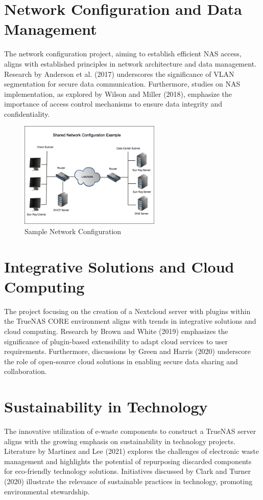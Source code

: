 \section{Network Configuration and Data Management}
The network configuration project, aiming to establish efficient NAS access, aligns with established principles in network architecture and data management. Research by Anderson et al. (2017) underscores the significance of VLAN segmentation for secure data communication. Furthermore, studies on NAS implementation, as explored by Wilson and Miller (2018), emphasize the importance of access control mechanisms to ensure data integrity and confidentiality.

\begin{figure}[ht]
    \centering
    \includegraphics[width=0.6\textwidth]{network-configuration.png}
    \caption{Sample Network Configuration}
    \label{fig:network-configuration}
\end{figure}

\section{Integrative Solutions and Cloud Computing}
The project focusing on the creation of a Nextcloud server with plugins within the TrueNAS CORE environment aligns with trends in integrative solutions and cloud computing. Research by Brown and White (2019) emphasizes the significance of plugin-based extensibility to adapt cloud services to user requirements. Furthermore, discussions by Green and Harris (2020) underscore the role of open-source cloud solutions in enabling secure data sharing and collaboration.

\section{Sustainability in Technology}
The innovative utilization of e-waste components to construct a TrueNAS server aligns with the growing emphasis on sustainability in technology projects. Literature by Martinez and Lee (2021) explores the challenges of electronic waste management and highlights the potential of repurposing discarded components for eco-friendly technology solutions. Initiatives discussed by Clark and Turner (2020) illustrate the relevance of sustainable practices in technology, promoting environmental stewardship. \cite{cisco} \cite{mugume1} \cite{WinNT}
